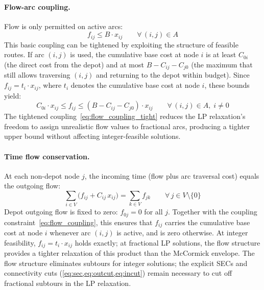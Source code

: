 \documentclass[preprint,11pt]{elsarticle}
\begin{document}
\paragraph{Flow-arc coupling.}
Flow is only permitted on active arcs:
\begin{equation}
  f_{ij} \leq B \cdot x_{ij} \qquad \forall\, (i,j) \in A
  \label{eq:flow_coupling}
\end{equation}
This basic coupling can be tightened by exploiting the structure of feasible routes.
If arc $(i,j)$ is used, the cumulative base cost at node $i$ is at least $C_{0i}$ (the direct cost from the depot) and at most $B - C_{ij} - C_{j0}$ (the maximum that still allows traversing $(i,j)$ and returning to the depot within budget).
Since $f_{ij} = t_i \cdot x_{ij}$, where $t_i$ denotes the cumulative base cost at node $i$, these bounds yield:
\begin{equation}
  C_{0i} \cdot x_{ij} \leq f_{ij} \leq (B - C_{ij} - C_{j0}) \cdot x_{ij} \qquad \forall\, (i,j) \in A,\; i \neq 0
  \label{eq:flow_coupling_tight}
\end{equation}
The tightened coupling~\eqref{eq:flow_coupling_tight} reduces the LP relaxation's freedom to assign unrealistic flow values to fractional arcs, producing a tighter upper bound without affecting integer-feasible solutions.

\paragraph{Time flow conservation.}
At each non-depot node $j$, the incoming time (flow plus arc traversal cost) equals the outgoing flow:
\begin{equation}
  \sum_{i \in V} \bigl(f_{ij} + C_{ij} \, x_{ij}\bigr) = \sum_{k \in V} f_{jk} \qquad \forall\, j \in V \setminus \{0\}
  \label{eq:flow_conservation}
\end{equation}
Depot outgoing flow is fixed to zero: $f_{0j} = 0$ for all $j$.
Together with the coupling constraint~\eqref{eq:flow_coupling}, this ensures that $f_{ij}$ carries the cumulative base cost at node $i$ whenever arc $(i,j)$ is active, and is zero otherwise.
At integer feasibility, $f_{ij} = t_i \cdot x_{ij}$ holds exactly; at fractional LP solutions, the flow structure provides a tighter relaxation of this product than the McCormick envelope.
The flow structure eliminates subtours for integer solutions; the explicit SECs and connectivity cuts (\cref{eq:sec,eq:outcut,eq:incut}) remain necessary to cut off fractional subtours in the LP relaxation.
\end{document}
